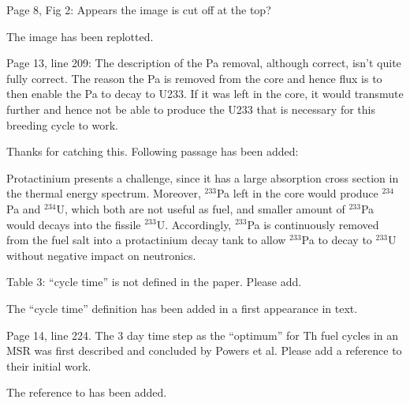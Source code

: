 \documentclass[answers,11pt]{exam}
\begin{document}
\begin{questions}
        \question  Page 8, Fig 2: Appears the image is cut off at the top?
        \begin{solution}
        The image has been replotted.
        \end{solution}

        \question  Page 13, line 209: The description of the Pa removal, 
        although correct, isn't quite fully correct. The reason the Pa is 
        removed from the core and hence flux is to then enable the Pa to decay 
        to U233. If it was left in the core, it would transmute further and 
        hence not be able to produce the U233 that is necessary for this 
        breeding cycle to work.
        \begin{solution}
        		Thanks for catching this. Following passage has been added:
        
		        Protactinium presents a challenge, since it has a large absorption cross 
				section in the thermal energy spectrum. Moreover, $^{233}$Pa left in the core
				 would produce $^{234}$Pa and $^{234}$U, which both are not useful as fuel, 
				and smaller amount of $^{233}$Pa would decays into the fissile $^{233}$U.
				Accordingly, $^{233}$Pa is continuously 
				removed from the fuel salt into a protactinium decay tank to allow $^{233}$Pa 
				to decay to $^{233}$U without negative impact on neutronics.
        \end{solution}

        \question  Table 3: ``cycle time'' is not defined in the paper. Please 
        add.
        \begin{solution}
		        The ``cycle time'' definition has been added in a first appearance in text.
        \end{solution}

        \question  Page 14, line 224. The 3 day time step as the ``optimum'' for 
        Th fuel cycles in an MSR was first described and concluded by Powers et 
        al. Please add a reference to their initial work.
        \begin{solution}
        		The reference to \cite{powers_new_2013} has been added.
        \end{solution}


\end{questions}
\end{document}
